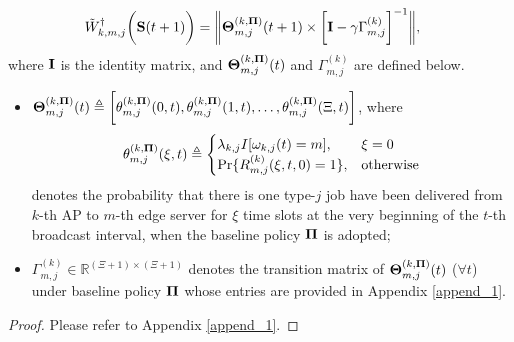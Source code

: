 \begin{lemma}
    \label{lemma:w_ap}
    \begin{align}
        &\tilde{W}^{\dagger}_{k,m,j}\bigg(\mathbf{S}(t+1)\bigg) =
        \bigg\|
            \boldsymbol{\Theta}^{(k, \boldsymbol{\Pi})}_{m,j}(t+1) \times
            \bigg[
                \mathbf{I} - \gamma \Gamma^{(k)}_{m,j}
            \bigg]^{-1}
        \bigg\|,
        \label{w_ap}
    \end{align}
    where $\mathbf{I}$ is the identity matrix, and $\boldsymbol{\Theta}^{(k, \boldsymbol{\Pi})}_{m,j}(t)$ and $\Gamma^{(k)}_{m,j}$ are defined below.
    \begin{itemize}
        \item {\small $\boldsymbol{\Theta}^{(k,\boldsymbol{\Pi})}_{m,j}(t) \triangleq \bigg[
            \theta^{(k,\boldsymbol{\Pi})}_{m,j}(0,t),
            \theta^{(k,\boldsymbol{\Pi})}_{m,j}(1,t),
            \dots,
            \theta^{(k,\boldsymbol{\Pi})}_{m,j}(\Xi,t)
            \bigg]$},
        where 
        \begin{align}
            \theta^{(k,\boldsymbol{\Pi})}_{m,j}(\xi,t) \triangleq 
            \begin{cases}
                \lambda_{k,j} I[\omega_{k,j}(t)=m], & \xi=0
                \\
                \Pr\{R^{(k)}_{m,j}(\xi,t,0) = 1\}, & \text{otherwise}
            \end{cases}
        \end{align}
        denotes the probability that there is one type-$j$ job have been delivered from $k$-th AP to $m$-th edge server for $\xi$ time slots at the very beginning of the $t$-th broadcast interval, when the baseline policy $\boldsymbol{\Pi}$ is adopted;
        \item $\Gamma^{(k)}_{m,j} \in \mathbb{R}^{(\Xi+1)\times(\Xi+1)}$ denotes the transition matrix of $\boldsymbol{\Theta}^{(k,\boldsymbol{\Pi})}_{m,j}(t)$ ($\forall t$) under baseline policy $\boldsymbol{\Pi}$ whose entries are provided in Appendix \ref{append_1}.
    \end{itemize}
\end{lemma}
\begin{proof}
    Please refer to Appendix \ref{append_1}.
\end{proof}

